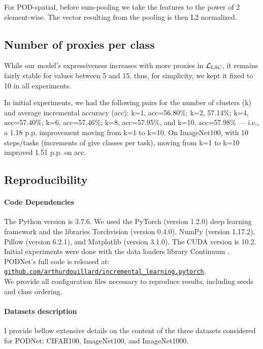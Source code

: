 For POD-spatial, before sum-pooling we take the features to the power of 2 element-wise. The vector
resulting from the pooling is then L2 normalized.

\subsection{Number of proxies per class}

While our model's expressiveness increases with more proxies in $\mathcal{L}_\text{LSC}$, it remains fairly
stable for values between 5 and 15, thus, for simplicity, we kept it fixed to 10 in all experiments.

In initial experiments, we had the following pairs for the number of clusters (k) and average
incremental accuracy (acc): k=1, acc=56.80\%; k=2, 57.14\%; k=4, acc=57.40\%; k=6, acc=57.46\%; k=8,
acc=57.95\%, and k=10, acc=57.98\% --- i.e., a 1.18 p.p. improvement moving from k=1 to k=10. On
ImageNet100, with 10 steps/tasks (increments of give classes per task), moving from k=1 to k=10
improved 1.51 p.p. on acc.

\subsection{Reproducibility}

\paragraph{Code Dependencies} The Python version is  3.7.6. We used the PyTorch
\citep{paszke2017pytorch} (version 1.2.0) deep learning framework and the libraries Torchvision
(version 0.4.0), NumPy \citep{oliphant2006numpy} (version 1.17.2), Pillow (version 6.2.1), and
Matplotlib \citep{hunter2007matplotlib} (version 3.1.0). The CUDA version is 10.2. Initial
experiments were done with the data loaders library Continuum \citep{douillardlesort2020continuum}.
PODNet's full code is released at:\\
\href{https://github.com/arthurdouillard/incremental\_learning.pytorch}{\texttt{github.com/arthurdouillard/incremental\_learning.pytorch}}.
\\We provide all configuration files necessary to reproduce results, including seeds and class
ordering.

\paragraph{Datasets description} I provide bellow extensive details on the content of the three
datasets considered for PODNet: CIFAR100, ImageNet100, and ImageNet1000.

